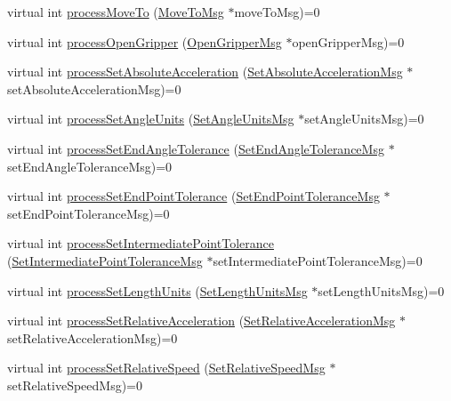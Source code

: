 \begin{DoxyCompactItemize}
\item 
virtual int \hyperlink{class_controller_ac5cf7c0b8dd2425a4a1d2a374a4db757}{processMoveTo} (\hyperlink{class_move_to_msg}{MoveToMsg} $\ast$moveToMsg)=0
\item 
virtual int \hyperlink{class_controller_af6c4c75d0d89983475c0dda414b4a4f1}{processOpenGripper} (\hyperlink{class_open_gripper_msg}{OpenGripperMsg} $\ast$openGripperMsg)=0
\item 
virtual int \hyperlink{class_controller_a2bcd07407b259343dbf12a457505946d}{processSetAbsoluteAcceleration} (\hyperlink{class_set_absolute_acceleration_msg}{SetAbsoluteAccelerationMsg} $\ast$setAbsoluteAccelerationMsg)=0
\item 
virtual int \hyperlink{class_controller_a80daac4509d5936f966e5289528e2b7c}{processSetAngleUnits} (\hyperlink{class_set_angle_units_msg}{SetAngleUnitsMsg} $\ast$setAngleUnitsMsg)=0
\item 
virtual int \hyperlink{class_controller_a698966c052faebede44e65a0b2b16493}{processSetEndAngleTolerance} (\hyperlink{class_set_end_angle_tolerance_msg}{SetEndAngleToleranceMsg} $\ast$setEndAngleToleranceMsg)=0
\item 
virtual int \hyperlink{class_controller_a5a8fc3403231a34be7f4a6426c6c1954}{processSetEndPointTolerance} (\hyperlink{class_set_end_point_tolerance_msg}{SetEndPointToleranceMsg} $\ast$setEndPointToleranceMsg)=0
\item 
virtual int \hyperlink{class_controller_a1a3cf77b97ccce4a364f556118ea3eb0}{processSetIntermediatePointTolerance} (\hyperlink{class_set_intermediate_point_tolerance_msg}{SetIntermediatePointToleranceMsg} $\ast$setIntermediatePointToleranceMsg)=0
\item 
virtual int \hyperlink{class_controller_a2158164839e7019556d4785528fc5874}{processSetLengthUnits} (\hyperlink{class_set_length_units_msg}{SetLengthUnitsMsg} $\ast$setLengthUnitsMsg)=0
\item 
virtual int \hyperlink{class_controller_a977a24df59729a6f795ea179af3d05a4}{processSetRelativeAcceleration} (\hyperlink{class_set_relative_acceleration_msg}{SetRelativeAccelerationMsg} $\ast$setRelativeAccelerationMsg)=0
\item 
virtual int \hyperlink{class_controller_a25229410c00d8baf4fa2fde5fa7549c0}{processSetRelativeSpeed} (\hyperlink{class_set_relative_speed_msg}{SetRelativeSpeedMsg} $\ast$setRelativeSpeedMsg)=0
\end{DoxyCompactItemize}


